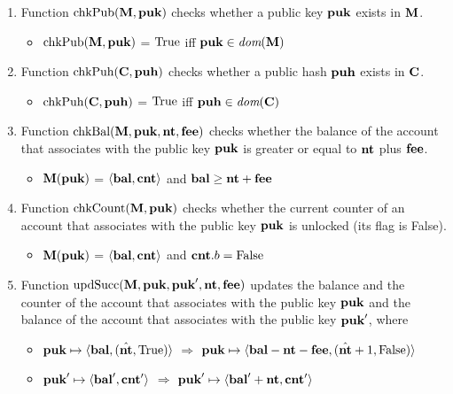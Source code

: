 \documentclass[a4paper]{llncs}
\begin{document}
\begin{enumerate}
    \item Function $\textup{chkPub}(\textbf{M}, \textbf{puk})$ checks whether a public key $\textbf{puk}$ exists in $\textbf{M}$.
    \begin{itemize}
    \item[] $\textup{chkPub}(\textbf{M}, \textbf{puk})$ = $\text{True}$ iff $\textbf{puk} \in \textit{dom}(\textbf{M})$
    \end{itemize}
    \item Function $\textup{chkPuh}(\textbf{C}, \textbf{puh})$ checks whether a public hash $\textbf{puh}$ exists in $\textbf{C}$.
     \begin{itemize}
    \item[] $\textup{chkPuh}(\textbf{C}, \textbf{puh})$ = $\text{True}$ iff $\textbf{puh} \in \textit{dom}(\textbf{C})$
    \end{itemize}
    \item Function $\textup{chkBal} (\textbf{M}, \textbf{puk}, \textbf{nt}, \textbf{fee})$ checks whether the balance of the account that associates with the public key $\textbf{puk}$ is greater or equal to $\textbf{nt}$ plus $\textbf{fee}$.
    \begin{itemize}
    \item[] $\textbf{M}(\textbf{puk})$ = $\langle\textbf{bal}, \textbf{cnt}\rangle$ and $\textbf{bal} \ge \textbf{nt} + \textbf{fee}$
    \end{itemize}
    \item Function $\textup{chkCount} (\textbf{M}, \textbf{puk})$ checks whether the current counter of an account that associates with the public key $\textbf{puk}$ is unlocked (its flag is False).
    \begin{itemize}
    \item[] $\textbf{M}(\textbf{puk})$ = $\langle\textbf{bal}, \textbf{cnt}\rangle$ and $\textbf{cnt}.b = \text{False}$
    \end{itemize}
    \item Function $\textup{updSucc}(\textbf{M}, \textbf{puk}, \textbf{puk}', \textbf{nt}, \textbf{fee})$ updates the balance and the counter of the account that associates with the public key $\textbf{puk}$ and the balance of the account that associates with the public key $\textbf{puk}'$, where
    \begin{itemize}
        \item[]  $\textbf{puk} \mapsto \langle\textbf{bal}, (\hat{\textbf{nt}}, \text{True})\rangle$ $\Rightarrow$ $ \textbf{puk} \mapsto \langle\textbf{bal} - \textbf{nt} - \textbf{fee}, (\hat{\textbf{nt}} + 1, \text{False})\rangle$     
        \item[] $\textbf{puk}' \mapsto \langle  \textbf{bal}', \textbf{cnt}' \rangle$ $\Rightarrow$ $\textbf{puk}' \mapsto \langle \textbf{bal}' + \textbf{nt}, \textbf{cnt}' \rangle $         
    \end{itemize}
    

\end{enumerate}
\end{document}
